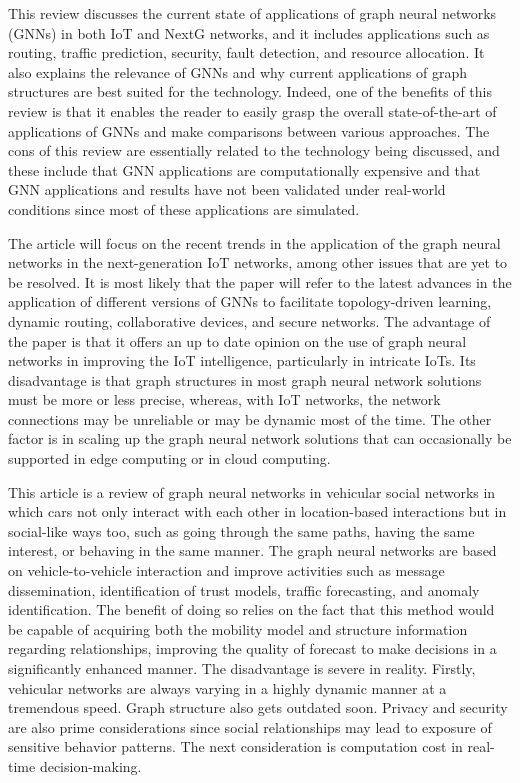 \documentclass[a4paper,fleqn]{cas-dc}
\numberwithin{equation}{section}
\begin{document}
This review \cite{KrishnaMoorthy20261803} discusses the current state of applications of graph neural networks (GNNs) in both IoT and NextG networks, and it includes applications such as routing, traffic prediction, security, fault detection, and resource allocation. It also explains the relevance of GNNs and why current applications of graph structures are best suited for the technology. Indeed, one of the benefits of this review is that it enables the reader to easily grasp the overall state-of-the-art of applications of GNNs and make comparisons between various approaches. The cons of this review are essentially related to the technology being discussed, and these include that GNN applications are computationally expensive and that GNN applications and results have not been validated under real-world conditions since most of these applications are simulated.

The article \cite{XuanTung20262226} will focus on the recent trends in the application of the graph neural networks in the next-generation IoT networks, among other issues that are yet to be resolved. It is most likely that the paper will refer to the latest advances in the application of different versions of GNNs to facilitate topology-driven learning, dynamic routing, collaborative devices, and secure networks. The advantage of the paper is that it offers an up to date opinion on the use of graph neural networks in improving the IoT intelligence, particularly in intricate IoTs. Its disadvantage is that graph structures in most graph neural network solutions must be more or less precise, whereas, with IoT networks, the network connections may be unreliable or may be dynamic most of the time. The other factor is in scaling up the graph neural network solutions that can occasionally be supported in edge computing or in cloud computing.

This article\cite{Binshaflout2026}  is a review of graph neural networks in vehicular social networks in which cars not only interact with each other in location-based interactions but in social-like ways too, such as going through the same paths, having the same interest, or behaving in the same manner. The graph neural networks are based on vehicle-to-vehicle interaction and improve activities such as message dissemination, identification of trust models, traffic forecasting, and anomaly identification. The benefit of doing so relies on the fact that this method would be capable of acquiring both the mobility model and structure information regarding relationships, improving the quality of forecast to make decisions in a significantly enhanced manner. The disadvantage is severe in reality. Firstly, vehicular networks are always varying in a highly dynamic manner at a tremendous speed. Graph structure also gets outdated soon. Privacy and security are also prime considerations since social relationships may lead to exposure of sensitive behavior patterns. The next consideration is computation cost in real-time decision-making.
\end{document}
